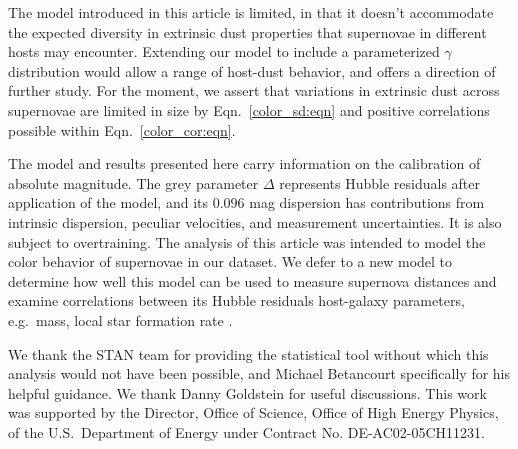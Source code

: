 \documentclass{aastex}   	%
\begin{document}
The model introduced in this article is limited, in that it doesn't accommodate the expected diversity
in extrinsic dust properties that supernovae in different hosts may encounter.  Extending our model to 
include  a parameterized  $\gamma$ distribution would allow a range of host-dust behavior, and
offers a direction of further study.
For the moment, we assert that variations in extrinsic dust across supernovae are limited in
size by Eqn.~\ref{color_sd:eqn} and positive correlations possible within Eqn.~\ref{color_cor:eqn}.


The model and results presented here
carry information on the calibration of absolute magnitude.  The grey parameter $\Delta$ represents Hubble residuals after
application of the model, and its  $0.096$ mag dispersion has contributions from intrinsic dispersion, peculiar velocities, and
measurement uncertainties.  It is also subject to overtraining.
The  analysis of this article was intended to model the color behavior of supernovae in our dataset.
We defer to a new model to determine how
well this model can be used to measure supernova distances
and examine correlations between its Hubble residuals host-galaxy parameters, e.g.\ mass,
local star formation rate \citep{2010ApJ...715..743K, 2013A&A...560A..66R}.


\acknowledgments
We thank the STAN team for providing the statistical tool without which this analysis would not have been possible,
and Michael Betancourt specifically for his helpful guidance.  We thank Danny Goldstein for useful discussions.
This work was supported by the Director, Office of Science, Office of High Energy Physics, 
of the U.S.\ Department of Energy under Contract No. DE-AC02-05CH11231.



\end{document}

